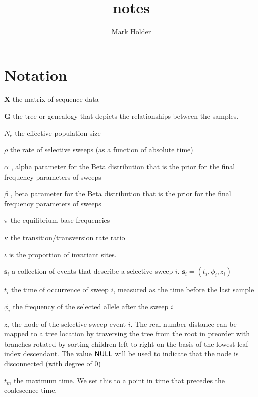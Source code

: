 \documentclass[letterpaper]{article}
\title{\chimnesweeps notes}
\author{Mark Holder}
\newcommand{\sweep}[1]{{\ensuremath{\mathbf{s}_{#1}}}}
\newcommand{\sweeptime}[1]{{\ensuremath{t_{#1}}}}
\newcommand{\sweepfreq}[1]{{\ensuremath{\phi_{#1}}}}
\newcommand{\sweeploc}[1]{{\ensuremath{z_{#1}}}}
\newcommand{\genealogy}{{\ensuremath{\mathbf{G}}}}
\newcommand{\sequences}{{\ensuremath{\mathbf{X}}}}
\newcommand{\popsize}{{\ensuremath{N_e}}}
\newcommand{\ratesweep}{{\ensuremath{\rho}}}
\newcommand{\sweepalpha}{{\ensuremath{\alpha}}}
\newcommand{\sweepbeta}{{\ensuremath{\beta}}}
\newcommand{\basefreqs}{{\ensuremath{\pi}}}
\newcommand{\pinvar}{{\ensuremath{\iota}}}
\newcommand{\NULL}{{\ensuremath{\mbox{{\bf \sf NULL}}}}}
\begin{document}
\maketitle
\setcounter{tocdepth}{2}



\tableofcontents


\section{Notation}
\begin{compactitem}
	\item[\sequences] the matrix of sequence data
	\item[\genealogy] the tree or genealogy that depicts the relationships between the samples.
	\item[\popsize] the effective population size
	\item[\ratesweep] the rate of selective sweeps (as a function of absolute time)
	 \item[\sweepalpha], alpha parameter for the Beta distribution that is the prior for the final frequency parameters of sweeps
	 \item[\sweepbeta], beta parameter for the Beta distribution that is the prior for the final frequency parameters of sweeps
	\item[\basefreqs] the equilibrium base frequencies
	\item[$\kappa$] the transition/transversion rate ratio
	\item[\pinvar] is the proportion of invariant sites.
	\item[\sweep{i}] a collection of events that describe a selective sweep $i$. $\sweep{i} = (\sweeptime{i},\sweepfreq{i}, \sweeploc{i})$
	\item[\sweeptime{i}] the time of occurrence of sweep $i$, measured as the time before the last sample 
	\item[\sweepfreq{i}] the frequency of the selected allele after the sweep $i$
	\item[\sweeploc{i}] the node of the selective sweep event $i$. The real number distance can be mapped to a tree location by traversing the tree from the root in preorder with branches rotated by sorting children left to right on the basis of the lowest leaf index descendant. The value $\NULL$ will be used to indicate that the node is disconnected (with degree of 0)
	\item[$t_m$] the maximum time. We set this to a point in time that precedes the coalescence time.  

\end{compactitem}
\end{document}
